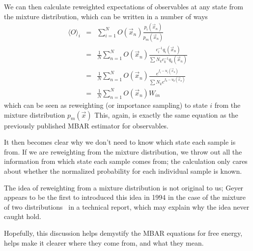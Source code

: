 \documentclass[aps,pre,twocolumn,superscriptaddress]{revtex4-1}
\begin{document}
We can then calculate reweighted expectations of observables at any
state from the mixture distribution, which can be written in a number of ways
\begin{eqnarray}
\langle O \rangle_i  &=& \sum_{i=1}^N O(\vec{x}_n) \frac{p_i(\vec{x}_n)}{p_m(\vec{x}_n)} \nonumber \\
                     &=&  \frac{1}{N}\sum_{n=1}^N O(\vec{x}_n) \frac{c_i^{-1} q_i(\vec{x}_n)}{\sum N_k c_k^{-1} q_k(\vec{x}_n)} \nonumber \\ 
                     &=&  \frac{1}{N}\sum_{n=1}^N O(\vec{x}_n) \frac{e^{f_i-u_i(\vec{x}_n)}}{\sum N_k e^{f_k - u_k(\vec{x}_n)}} \nonumber \\ 
    &=& \frac{1}{N}\sum_{n=1}^N  O(\vec{x}_n) W_{in} 
\end{eqnarray}
which can be seen as reweighting (or importance sampling) to state $i$
from the mixture distribution $p_m(\vec{x})$ This, again, is exactly
the same equation as the previously published MBAR estimator for
observables.

It then becomes clear why we don't need to know which state each
sample is from. If we are reweighting from the mixture distribution,
we throw out all the information from which state each sample comes
from; the calculation only cares about whether the normalized
probability for each individual sample is known.

The idea of reweighting from a mixture distribution is not original to
us; Geyer appears to be the first to introduced this idea in 1994 in
the case of the mixture of two distributions~\citep{geyer:1994} in a
technical report, which may explain why the idea never caught hold.

Hopefully, this discussion helps demystify the MBAR equations for free
energy, helps make it clearer where they come from, and what they
mean.



\end{document}
